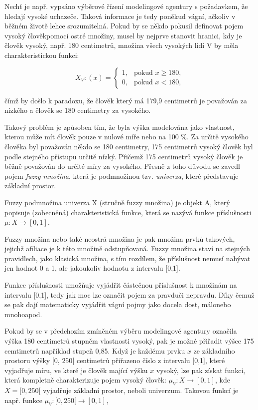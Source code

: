 Nech\v t je např. vypsáno výběrové řízení modelingové agentury s požadavkem, že hledají vysoké uchazeče. Taková informace je tedy poněkud vágní, ačkoliv v běžném životě lehce srozumitelná. Pokud by se někdo pokusil definovat pojem \clqq vysoký člověk\crqq \space pomocí ostré množiny, musel by nejprve stanovit hranici, kdy je člověk vysoký, např. 180 centimetr\r u, množina všech vysokých lidí V by měla charakteristickou funkci:

    $$X_V:(x)=\begin{cases} 1, & \mbox{pokud }  x \geq 180,\\    0, & \mbox{pokud } x < 180,  \end{cases}$$

    čímž by došlo k paradoxu, že člověk který má 179,9 centimetr\r u je považován za nízkého a člověk se 180 centimetry za vysokého.

    Takový problém je zp\r usoben tím, že byla výška modelována jako vlastnost, kterou m\r uže mít člověk pouze v nulové míře nebo na 100 \%. Za určitě vysokého člověka byl považován někdo se 180 centimetry, 175 centimetr\r u vysoký člověk byl podle stejného přístupu určitě n\'izk\'y. Přičemž 175 centimetr\r u vysoký člověk je běžně považován do určité míry za vysokého. Přesně z toho d\r uvodu se zavedl pojem \textit{fuzzy množina}, která je podmno\v zinou tzv. \textit{univerza}, které p\v redstavuje základní prostor. 
    
    \begin{definition}
    \cite{navara}
        Fuzzy podmnožina univerza X (stručně fuzzy množina) je objekt A, který popisuje (zobecněná) charakteristická funkce, která se nazývá funkce příslušnosti $\mu: X \rightarrow [0,1]$. 
    \end{definition}
    
    Fuzzy množina nebo také neostrá množina je pak množina prvků takových, jejichž afiliace je k této množině odstupňovaná. Fuzzy množina staví na stejných pravidlech, jako klasická množina, s tím rozdílem, že příslušnost nemusí nabývat jen hodnot 0 a 1, ale jakoukoliv hodnotu z intervalu [0,1]. 
   
    Funkce příslušnosti umož\v nuje vyjádřit částečnou příslušnost k množinám na intervalu [0,1], tedy jak moc lze označit pojem za \clqq pravdu\crqq \space či \clqq nepravdu\crqq. Díky čemuž se pak dají matematicky vyjádřit vágní pojmy jako \clqq docela dost\crqq, \clqq málo\crqq \space nebo \clqq mnoho\crqq \space apod.

     Pokud by se v předchozím zmíněném výběru modelingové agentury označila výška 180 centimetr\r u stupněm vlastnosti \clqq vysoký\crqq {}, pak je možné přiřadit výšce 175 cemtimetr\r u například stupe\v n 0,85. Když je každému prvku $x$ ze základního prostoru výšky [0, $250$[ centimetr\r u přiřazeno číslo z intervalu [0,1], které vyjadřuje míru, ve které je člověk mající výšku $x$ vysoký, lze pak získat funkci, která kompletně charakterizuje pojem vysoký člověk: $\mu_V: X \to [0,1]$, kde $X = [0, 250[$ vyjadřuje základní prostor, neboli univerzum. Takovou funkcí je např. funkce $\mu_V:  [0, 250[ \rightarrow [0,1]$, 

